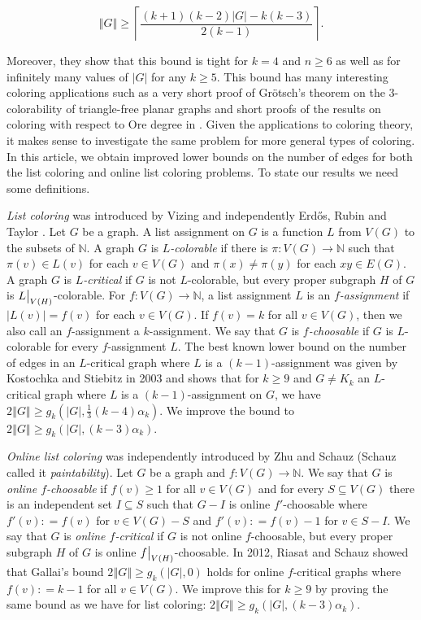 \documentclass[12pt]{article}
\theoremstyle{plain}
\theoremstyle{definition}
\theoremstyle{remark}
\newcommand{\IN}{\mathbb{N}}
\newcommand{\card}[1]{\left|#1\right|}
\newcommand{\size}[1]{\left\Vert#1\right\Vert}
\newcommand{\ceil}[1]{\left\lceil#1\right\rceil}
\newcommand{\func}[3]{#1\colon #2 \rightarrow #3}
\newcommand{\DefinedAs}{\mathrel{\mathop:}=}
\newcommand\restr[2]{{%
  \left.\kern-\nulldelimiterspace %
  #1 %
  \vphantom{\big|} %
  \right|_{#2} %
  }}
\begin{document}
\[\size{G} \geq \ceil{\frac{(k+1)(k-2)\card{G} - k(k-3)}{2(k-1)}}.\]

Moreover, they show that this bound is tight for $k=4$ and $n \geq 6$ as well as for infinitely many values of $\card{G}$ for any $k \geq 5$.  This bound has many interesting coloring applications such as a very short proof of Gr\"otsch's theorem on the $3$-colorability of triangle-free planar graphs \cite{kostochka2012oregrotsch} and short proofs of the results on coloring with respect to Ore degree in \cite{kierstead2009ore, rabern2010a, krs_one}.  Given the applications to coloring theory, it makes sense to investigate the same problem for more general types of coloring.  In this article, we obtain improved lower bounds on the number of edges for both the list coloring and online list coloring problems.  To state our results we need some definitions.

\emph{List coloring} was introduced by Vizing \cite{vizing1976} and independently Erd\H{o}s, Rubin and Taylor \cite{erdos1979choosability}.  Let $G$ be a graph. A list assignment on $G$ is a function $L$ from $V(G)$ to the subsets of $\IN$.   A graph $G$ is \emph{$L$-colorable} if there is $\func{\pi}{V(G)}{\IN}$ such that $\pi(v) \in L(v)$ for each $v \in V(G)$ and $\pi(x) \neq \pi(y)$ for each $xy \in E(G)$.   A graph $G$ is \emph{$L$-critical} if $G$ is not $L$-colorable, but every proper subgraph $H$ of $G$ is $\restr{L}{V(H)}$-colorable. For $\func{f}{V(G)}{\IN}$, a list assignment $L$ is an \emph{$f$-assignment} if $\card{L(v)} = f(v)$ for each $v \in V(G)$.  If $f(v) = k$ for all $v \in V(G)$, then we also call an $f$-assignment a $k$-assignment.  We say that $G$ is \emph{$f$-choosable} if $G$ is $L$-colorable for every $f$-assignment $L$.  The best known lower bound on the number of edges in an $L$-critical graph where $L$ is a $(k-1)$-assignment was given by Kostochka and Stiebitz \cite{kostochkastiebitzedgesincriticalgraph} in 2003 and shows that for $k \geq 9$ and $G \neq K_k$ an $L$-critical graph where $L$ is a $(k-1)$-assignment on $G$, we have $2\size{G} \geq g_k(\card{G}, \frac13 (k-4)\alpha_k)$.  We improve the bound to $2\size{G} \geq g_k(\card{G}, (k-3)\alpha_k)$.

\emph{Online list coloring} was independently introduced by Zhu \cite{zhu2009online} and Schauz \cite{schauz2009mr} (Schauz called it \emph{paintability}). Let $G$ be a graph and $\func{f}{V(G)}{\IN}$.  We say that $G$ is \emph{online $f$-choosable} if $f(v) \geq 1$ for all $v \in V(G)$ and for every $S \subseteq V(G)$ there is an independent set $I \subseteq S$ such that $G-I$ is online $f'$-choosable where $f'(v) \DefinedAs f(v)$ for $v \in V(G) - S$ and $f'(v) \DefinedAs f(v) - 1$ for $v \in S - I$.  We say that $G$ is \emph{online $f$-critical} if $G$ is not online $f$-choosable, but every proper subgraph $H$ of $G$ is online $\restr{f}{V(H)}$-choosable.  In 2012, Riasat and Schauz \cite{riasat2012critically} showed that Gallai's bound  $2\size{G} \geq g_k(\card{G}, 0)$ holds for online $f$-critical graphs where $f(v) \DefinedAs k-1$ for all $v \in V(G)$.  We improve this for $k \geq 9$ by proving the same bound as we have for list coloring: $2\size{G} \geq g_k(\card{G}, (k-3)\alpha_k)$.
\end{document}
